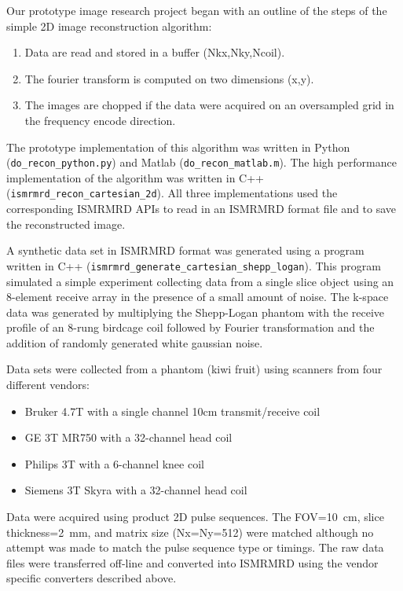 \documentclass[12pt]{article}
\begin{document}
Our prototype image research project began with an outline of the steps of the simple 2D image reconstruction algorithm:
\begin{enumerate}
\item Data are read and stored in a buffer (Nkx,Nky,Ncoil).
\item The fourier transform is computed on two dimensions (x,y).
\item The images are chopped if the data were acquired on an oversampled grid in the frequency encode direction.
\end{enumerate}
The prototype implementation of this algorithm was written in Python (\texttt{do\_recon\_python.py}) and Matlab (\texttt{do\_recon\_matlab.m}).  The high performance implementation of the algorithm was written in C++ (\texttt{ismrmrd\_recon\_cartesian\_2d}).  All three implementations used the corresponding ISMRMRD APIs to read in an ISMRMRD format file and to save the reconstructed image.

A synthetic data set in ISMRMRD format was generated using a program written in C++ (\texttt{ismrmrd\_generate\_cartesian\_shepp\_logan}).  This program simulated a simple experiment collecting data from a single slice object using an 8-element receive array in the presence of a small amount of noise.  The k-space data was generated by multiplying the Shepp-Logan phantom with the receive profile of an 8-rung birdcage coil followed by Fourier transformation and the addition of randomly generated white gaussian noise.

Data sets were collected from a phantom (kiwi fruit) using scanners from four different vendors: 
\begin{itemize}
\item Bruker 4.7T with a single channel 10cm transmit/receive coil
\item GE 3T MR750 with a 32-channel head coil
\item Philips 3T with a 6-channel knee coil
\item Siemens 3T Skyra with a 32-channel head coil
\end{itemize}
Data were acquired using product 2D pulse sequences.  The FOV=10~cm, slice thickness=2~mm, and matrix size (Nx=Ny=512) were matched although no attempt was made to match the pulse sequence type or timings.  The raw data files were transferred off-line and converted into ISMRMRD using the vendor specific converters described above.	
\end{document}
